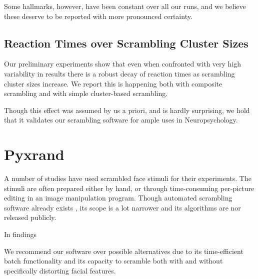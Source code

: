 	Some hallmarks, however, have been constant over all our runs, and we believe these deserve to be reported with more pronounced certainty.
	\subsection{Reaction Times over Scrambling Cluster Sizes}
	    Our preliminary experiments show that even when confronted with very high variability in results there is a robust decay of reaction times as scrambling cluster sizes increase.
	    We report this is happening both with composite scrambling and with simple cluster-based scrambling.
	    
	    Though this effect was assumed by us a priori, and is hardly surprising, we hold that it validates our scrambling software for ample uses in Neuropsychology.
    \section{Pyxrand}
    A number of studies\citep{Rakover2013} have used scrambled face stimuli for their experiments.
    The stimuli are often prepared either by hand, or through time-consuming per-picture editing in an image manipulation program.
    Though automated scrambling software already exists \citep{Conway2008}, its scope is a lot narrower and its algorithms are nor released publicly.
    
    In findings 
    
    We recommend our software over possible alternatives due to its time-efficient batch functionality and its capacity to scramble both with and without specifically distorting facial features.



